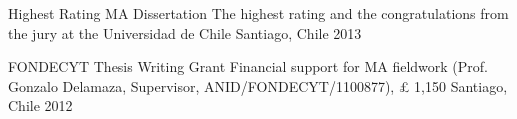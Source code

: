 \vspace{1mm}

\begin{cvhonors}
\cvhonor
{Highest Rating MA Dissertation}
{The highest rating and the congratulations from the jury at the Universidad de Chile}
{Santiago, Chile}
{2013}
\end{cvhonors}

\vspace{1mm}

\begin{cvhonors}
\cvhonor
{FONDECYT Thesis Writing Grant}
{Financial support for MA fieldwork (Prof. Gonzalo Delamaza, Supervisor, ANID/FONDECYT/1100877), {\pounds} 1,150}
{Santiago, Chile}
{2012}
\end{cvhonors}

\vspace{1mm}

